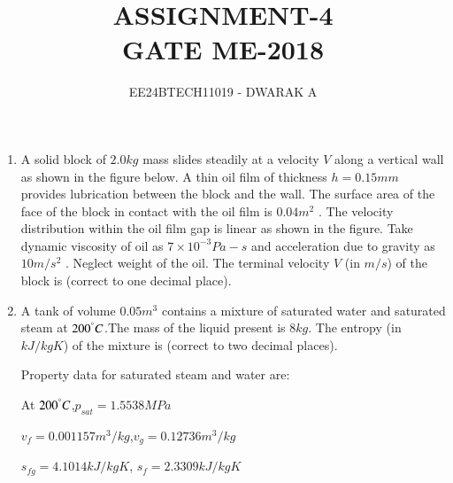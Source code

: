 \documentclass[journal]{IEEEtran}
\begin{document}

\vspace{3cm}

\title{\textbf{ASSIGNMENT-4\\GATE ME-2018}}
\author{EE24BTECH11019 - DWARAK A}
\maketitle

\bigskip

\renewcommand{\thefigure}{\theenumi}
\renewcommand{\thetable}{\theenumi}

\begin{enumerate}

\subsection*{Q.26 to Q.55 carry two marks each.}

    \item A solid block of $2.0 kg$ mass slides steadily at a velocity $V$ along a vertical wall as shown in the figure below. A thin oil film of thickness $h=0.15mm$ provides lubrication between the block and the wall. The surface area of the face of the block in contact with the oil film is $0.04 m^2$ . The velocity distribution within the oil film gap is linear as shown in the figure. Take dynamic viscosity of oil as $7\times10^{-3} Pa-s$ and acceleration due to gravity as $10 m/s^2$ . Neglect weight of the oil. The terminal velocity $V$ (in $m/s$) of the block is \underline{\hspace{1cm}} (correct to one decimal place).
        \begin{figure}[!ht]
            \centering
            
        \end{figure}

    \item A tank of volume $0.05 m^3$ contains a mixture of saturated water and saturated steam at $200^\degree C$.The mass of the liquid present is $8 kg$. The entropy (in $kJ/kg K$) of the mixture is \underline{\hspace{1cm}} (correct to two decimal places).

        Property data for saturated steam and water are:

        At $200^\degree C$,$p_{sat}= 1.5538 MPa$

        $v_{f} = 0.001157 m^3/kg$,$v_{g} = 0.12736 m^3/kg$

        $s_{fg} = 4.1014 kJ/kg K$, $s_{f} = 2.3309 kJ/kg K$
    

\end{enumerate}
\end{document}
